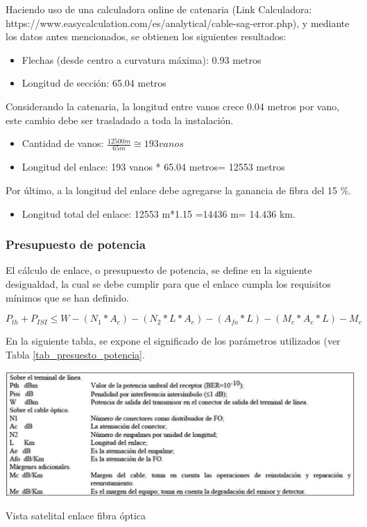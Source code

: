 \documentclass[12pt,a4paper]{book}
\begin{document}
Haciendo uso de una calculadora online de catenaria (Link Calculadora: https://www.easycalculation.com/es/analytical/cable-sag-error.php), y mediante los datos antes mencionados, se obtienen los siguientes resultados:

\begin{itemize}
\item Flechas (desde centro a curvatura máxima): 0.93 metros
\item Longitud de sección: 65.04 metros
\end{itemize}

Considerando la catenaria, la longitud entre vanos crece 0.04 metros por vano, este cambio debe ser trasladado a toda la instalación.

\begin{itemize}
\item Cantidad de vanos: $\frac{12500 m}{65 m} \cong 193 vanos$
\item Longitud del enlace: 193 vanos * 65.04 metros= 12553 metros
\end{itemize}

Por último, a la longitud del enlace debe agregarse la ganancia de fibra del 15 \%.
\begin{itemize}
\item Longitud total del enlace: 12553 m*1.15 =14436 m= 14.436 km.
\end{itemize}

\subsubsection{Presupuesto de potencia} \label{subsec_presupuesto_potencia_fibra}

El cálculo de enlace, o presupuesto de potencia, se define en la siguiente desigualdad, la cual se debe cumplir para que el enlace cumpla los requisitos mínimos que se han definido.

\begin{equation} \label{ec_presupuesto_potencia_fibra}
P_{th}+P_{ISI} \leq W - (N_{1}*A_{c}) - (N_{2}*L*A_{e}) - (A_{fo}*L) - (M_{c}*A_{e}*L) - M_{e}
\end{equation}

En la siguiente tabla, se expone el significado de los parámetros utilizados (ver Tabla \ref{tab_presuesto_potencia}.

\begin{table}
\centering
\includegraphics[width= 8 cm]{../figuras/table_fibra.jpg}
\caption{Vista satelital enlace fibra óptica}
\label{tab_presuesto_potencia}
\end{table}
\end{document}
